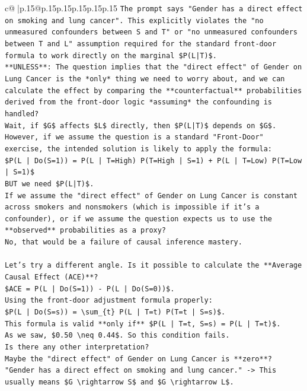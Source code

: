 \documentclass{article}
\begin{document}
{\begin{supertabular}{c@{$\;$}|p{.15\linewidth}@{}p{.15\linewidth}p{.15\linewidth}p{.15\linewidth}p{.15\linewidth}p{.15\linewidth}}
{{{\texttt{The prompt says "Gender has a direct effect on smoking and lung cancer". This explicitly violates the "no unmeasured confounders between S and T" or "no unmeasured confounders between T and L" assumption required for the standard front{-}door formula to work directly on the marginal \$P(L|T)\$.} \\
\texttt{**UNLESS**: The question implies that the "direct effect" of Gender on Lung Cancer is the *only* thing we need to worry about, and we can calculate the effect by comparing the **counterfactual** probabilities derived from the front{-}door logic *assuming* the confounding is handled?} \\
\texttt{Wait, if \$G\$ affects \$L\$ directly, then \$P(L|T)\$ depends on \$G\$.} \\
\texttt{However, if we assume the question is a standard "Front{-}Door" exercise, the intended solution is likely to apply the formula:} \\
\texttt{\$P(L | Do(S=1)) = P(L | T=High) P(T=High | S=1) + P(L | T=Low) P(T=Low | S=1)\$} \\
\texttt{BUT we need \$P(L|T)\$.} \\
\texttt{If we assume the "direct effect" of Gender on Lung Cancer is constant across smokers and nonsmokers (which is impossible if it's a confounder), or if we assume the question expects us to use the **observed** probabilities as a proxy?} \\
\texttt{No, that would be a failure of causal inference mastery.} \\
\\ 
\texttt{Let's try a different angle. Is it possible to calculate the **Average Causal Effect (ACE)**?} \\
\texttt{\$ACE = P(L | Do(S=1)) {-} P(L | Do(S=0))\$.} \\
\texttt{Using the front{-}door adjustment formula properly:} \\
\texttt{\$P(L | Do(S=s)) = \textbackslash{}sum\_\{t\} P(L | T=t) P(T=t | S=s)\$.} \\
\texttt{This formula is valid **only if** \$P(L | T=t, S=s) = P(L | T=t)\$.} \\
\texttt{As we saw, \$0.50 \textbackslash{}neq 0.44\$. So this condition fails.} \\
\texttt{Is there any other interpretation?} \\
\texttt{Maybe the "direct effect" of Gender on Lung Cancer is **zero**?} \\
\texttt{"Gender has a direct effect on smoking and lung cancer." {-}> This usually means \$G \textbackslash{}rightarrow S\$ and \$G \textbackslash{}rightarrow L\$.} \\
}}}
\end{supertabular}}
\end{document}
